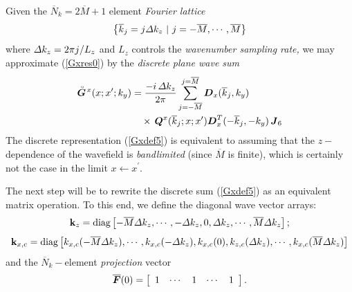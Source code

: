 \documentclass[11pt,a4paper]{article}
\newcommand{\bmi}[1]{\mbox{\boldmath$\mit #1$\unboldmath}}
\newcommand{\rf}[1]{\stackrel{\scriptscriptstyle _{\,\,\circ}}{ #1}}
\begin{document}
Given the $\overline{N}_k=2 \overline{M}+1$ element {\em Fourier lattice\/}
\begin{equation} \label{pxspec}
\left\{
 \overline{k}_{j} =j {\mit \Delta} k_{z} \ |\  j=-\overline{M},\cdots
 ,\overline{M}
\right\}
\end{equation}
where ${\mit \Delta} k_{z} =2 \pi  j/L_{z}$ and   $L_{z}$
controls the  {\em wavenumber sampling rate,\/} we may approximate
(\ref{Gxres0}) by the {\em discrete
plane wave sum\/}
\begin{align} \label{Gxdef5}
\rf{\bmi G}\!{}^{x}({ x};{ x}^{\prime};k_y)&=\frac{- i\,{\mit \Delta} {k}_{z}}{2 \pi}
\sum\limits_{{j=-\overline{M}}}^{j=\overline{M}}
{\bmi  D}_{x}(\overline{k}_{j},{k}_{y})\nonumber\\
&\quad\times\,{\bmi Q}^{x}(\overline{k}_{j};x;x^{\prime}){\bmi  D}_{x}^{T}(-\overline{k}_{j},-{k}_{y})
\,{\bmi  J}_6
\end{align}
The discrete representation (\ref{Gxdef5}) is equivalent to assuming that the
$z-$dependence of the wavefield is {\em  bandlimited\/} (since $\overline{M}$ is
finite), which is certainly not the case in the limit $x \leftarrow
x^{\prime}$.


The next step will be to rewrite the discrete sum (\ref{Gxdef5}) as an
equivalent matrix operation. To this end, we define the diagonal wave
vector arrays:
\begin{equation} \label{gbarKz}
{\bf  k}_{z} =\mbox{diag}\left[{-\overline{M} {\mit \Delta} k_{z},\cdots,-{\mit
\Delta} k_{z},0,
{\mit \Delta} k_{z},\cdots, \overline{M} {\mit \Delta} k_{z}}\right];
\end{equation}
\begin{equation} \label{gbarKx}
{\bf  k}_{x,c} =\mbox{diag}\left[{{ k}_{x,c}(-\overline{M} {\mit \Delta} k_{z}),\cdots,
{ k}_{x,c}(-{\mit \Delta} k_{z}),
{ k}_{x,c}(0),
{ k}_{z,c}({\mit \Delta} k_{z}),\cdots, { k}_{x,c}(\overline{M}{\mit \Delta} k_{z})}\right]
\end{equation}
and the $\overline{N}_k-$element {\em projection \/} vector
\begin{equation} \label{Fbardef}
\overline{\bmi F}(0)=\left[\begin{array}{ccccc}
1& \cdots &
1& \cdots &
1\end{array}\right].
\end{equation}
\end{document}
